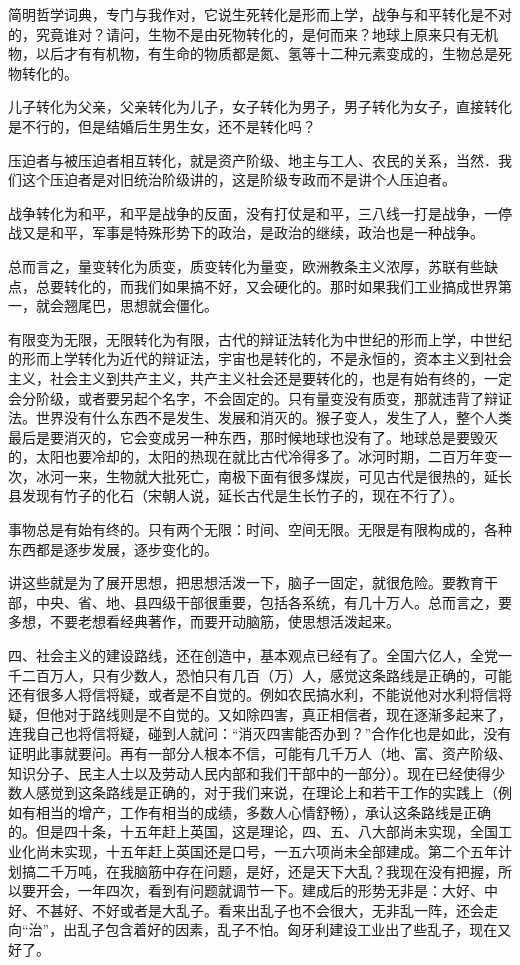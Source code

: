 简明哲学词典，专门与我作对，它说生死转化是形而上学，战争与和平转化是不对的，究竟谁对？请问，生物不是由死物转化的，是何而来？地球上原来只有无机物，以后才有有机物，有生命的物质都是氮、氢等十二种元素变成的，生物总是死物转化的。

儿子转化为父亲，父亲转化为儿子，女子转化为男子，男子转化为女子，直接转化是不行的，但是结婚后生男生女，还不是转化吗？

压迫者与被压迫者相互转化，就是资产阶级、地主与工人、农民的关系，当然．我们这个压迫者是对旧统治阶级讲的，这是阶级专政而不是讲个人压迫者。

战争转化为和平，和平是战争的反面，没有打仗是和平，三八线一打是战争，一停战又是和平，军事是特殊形势下的政治，是政治的继续，政治也是一种战争。

总而言之，量变转化为质变，质变转化为量变，欧洲教条主义浓厚，苏联有些缺点，总要转化的，而我们如果搞不好，又会硬化的。那时如果我们工业搞成世界第一，就会翘尾巴，思想就会僵化。

有限变为无限，无限转化为有限，古代的辩证法转化为中世纪的形而上学，中世纪的形而上学转化为近代的辩证法，宇宙也是转化的，不是永恒的，资本主义到社会主义，社会主义到共产主义，共产主义社会还是要转化的，也是有始有终的，一定会分阶级，或者要另起个名字，不会固定的。只有量变没有质变，那就违背了辩证法。世界没有什么东西不是发生、发展和消灭的。猴子变人，发生了人，整个人类最后是要消灭的，它会变成另一种东西，那时候地球也没有了。地球总是要毁灭的，太阳也要冷却的，太阳的热现在就比古代冷得多了。冰河时期，二百万年变一次，冰河一来，生物就大批死亡，南极下面有很多煤炭，可见古代是很热的，延长县发现有竹子的化石（宋朝人说，延长古代是生长竹子的，现在不行了）。

事物总是有始有终的。只有两个无限：时间、空间无限。无限是有限构成的，各种东西都是逐步发展，逐步变化的。

讲这些就是为了展开思想，把思想活泼一下，脑子一固定，就很危险。要教育干部，中央、省、地、县四级干部很重要，包括各系统，有几十万人。总而言之，要多想，不要老想看经典著作，而要开动脑筋，使思想活泼起来。

四、社会主义的建设路线，还在创造中，基本观点已经有了。全国六亿人，全党一千二百万人，只有少数人，恐怕只有几百（万）人，感觉这条路线是正确的，可能还有很多人将信将疑，或者是不自觉的。例如农民搞水利，不能说他对水利将信将疑，但他对于路线则是不自觉的。又如除四害，真正相信者，现在逐渐多起来了，连我自己也将信将疑，碰到人就问：“消灭四害能否办到？”合作化也是如此，没有证明此事就要问。再有一部分人根本不信，可能有几千万人（地、富、资产阶级、知识分子、民主人士以及劳动人民内部和我们干部中的一部分）。现在已经使得少数人感觉到这条路线是正确的，对于我们来说，在理论上和若干工作的实践上（例如有相当的增产，工作有相当的成绩，多数人心情舒畅），承认这条路线是正确的。但是四十条，十五年赶上英国，这是理论，四、五、八大部尚未实现，全国工业化尚未实现，十五年赶上英国还是口号，一五六项尚未全部建成。第二个五年计划搞二千万吨，在我脑筋中存在问题，是好，还是天下大乱？我现在没有把握，所以要开会，一年四次，看到有问题就调节一下。建成后的形势无非是：大好、中好、不甚好、不好或者是大乱子。看来出乱子也不会很大，无非乱一阵，还会走向“治”，出乱子包含着好的因素，乱子不怕。匈牙利建设工业出了些乱子，现在又好了。

